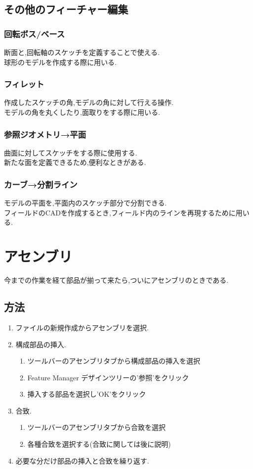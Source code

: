 \documentclass[a4paper,11pt]{jsarticle}
\begin{document}
\subsection{その他のフィーチャー編集}
\subsubsection{回転ボス/ベース}
断面と,回転軸のスケッチを定義することで使える.\\
球形のモデルを作成する際に用いる.
\subsubsection{フィレット}
作成したスケッチの角,モデルの角に対して行える操作.\\
モデルの角を丸くしたり,面取りをする際に用いる.
\subsubsection{参照ジオメトリ→平面}
曲面に対してスケッチをする際に使用する.\\
新たな面を定義できるため,便利なときがある.
\subsubsection{カーブ→分割ライン}
モデルの平面を,平面内のスケッチ部分で分割できる.\\
フィールドのCADを作成するとき,フィールド内のラインを再現するために用いる.
\section{アセンブリ}
今までの作業を経て部品が揃って来たら,ついにアセンブリのときである.
\subsection{方法}
\begin{enumerate}
 \item ファイルの新規作成からアセンブリを選択.
 \item 構成部品の挿入.
 \begin{enumerate}
  \item ツールバーのアセンブリタブから構成部品の挿入を選択
  \item Feature Manager デザインツリーの'参照'をクリック
  \item 挿入する部品を選択し'OK'をクリック
 \end{enumerate}
 \item 合致.
 \begin{enumerate}
  \item ツールバーのアセンブリタブから合致を選択
  \item 各種合致を選択する(合致に関しては後に説明)
 \end{enumerate}
 \item 必要な分だけ部品の挿入と合致を繰り返す.
\end{enumerate}
\end{document}
